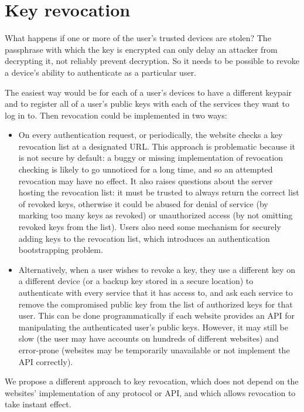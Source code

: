 \section{Key revocation}

What happens if one or more of the user's trusted devices are stolen? The passphrase with which the
key is encrypted can only delay an attacker from decrypting it, not reliably prevent decryption. So
it needs to be possible to revoke a device's ability to authenticate as a particular user.

The easiest way would be for each of a user's devices to have a different keypair and to register
all of a user's public keys with each of the services they want to log in to. Then revocation could
be implemented in two ways:

\begin{itemize}
\item On every authentication request, or periodically, the website checks a key revocation list at
a designated URL. This approach is problematic because it is not secure by default: a buggy or
missing implementation of revocation checking is likely to go unnoticed for a long time, and so an
attempted revocation may have no effect. It also raises questions about the server hosting the
revocation list: it must be trusted to always return the correct list of revoked keys, otherwise it
could be abused for denial of service (by marking too many keys as revoked) or unauthorized access
(by not omitting revoked keys from the list). Users also need some mechanism for securely adding
keys to the revocation list, which introduces an authentication bootstrapping problem.
\item Alternatively, when a user wishes to revoke a key, they use a different key on a different
device (or a backup key stored in a secure location) to authenticate with every service that it has
access to, and ask each service to remove the compromised public key from the list of authorized
keys for that user. This can be done programmatically if each website provides an API for
manipulating the authenticated user's public keys. However, it may still be slow (the user may have
accounts on hundreds of different websites) and error-prone (websites may be temporarily unavailable
or not implement the API correctly).
\end{itemize}

We propose a different approach to key revocation, which does not depend on the websites'
implementation of any protocol or API, and which allows revocation to take instant effect.

